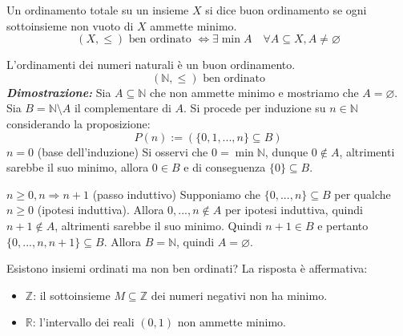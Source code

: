 \begin{tcolorbox}[colback=yellow!30, colframe=yellow!30!black, title=Insieme ben ordinato]
Un ordinamento totale su un insieme $X$ si dice buon ordinamento se ogni sottoinsieme
non vuoto di $X$ ammette minimo.
\[ (X,\leq) \text{ ben ordinato } \Longleftrightarrow \exists \min A \quad \forall A \subseteq X, A \not = \varnothing \]
\end{tcolorbox}

\begin{tcolorbox}[title={Buon ordinamento di $\mathbb{N}$}]
L'ordinamenti dei numeri naturali è un buon ordinamento.
\[ (\mathbb{N},\leq) \text{ ben ordinato} \]
\emph{\textbf{Dimostrazione:}} Sia $A \subseteq \mathbb{N}$ che non
ammette minimo e mostriamo che $A = \varnothing$.
Sia $B = \mathbb{N}\setminus A$ il complementare di $A$. Si procede per induzione su
$n \in \mathbb{N}$ considerando la proposizione:
\[ P(n) := \left(\{0,1,...,n\} \subseteq B\right) \]
$n=0$ (base dell'induzione) Si osservi che $0 = \min\mathbb{N}$, dunque
$0 \not \in A$, altrimenti sarebbe il suo minimo,
allora $0 \in B$ e di conseguenza $\{0\} \subseteq B$.

$n\geq0, n\Longrightarrow n+1$ (passo induttivo)
Supponiamo che $\{0,...,n\} \subseteq B$ per qualche $n\geq0$ (ipotesi
induttiva). Allora
$0,...,n \not \in A$ per ipotesi induttiva, quindi $n+1 \not \in A$,
altrimenti sarebbe il suo minimo. Quindi $n+1 \in B$ e pertanto
$\{0,...,n,n+1\} \subseteq B$. Allora $B = \mathbb{N}$, quindi
$A = \varnothing$.
\cvd
\end{tcolorbox}

Esistono insiemi ordinati ma non ben ordinati? La risposta è affermativa:
\begin{itemize}
    \item $\mathbb{Z}$: il sottoinsieme $M\subseteq \mathbb{Z}$ dei numeri negativi non ha minimo.
    \item $\mathbb{R}$: l'intervallo dei reali $(0,1)$ non ammette minimo.
\end{itemize}




